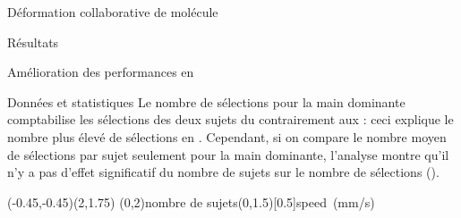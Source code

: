\documentclass[myfrancais,ngerman,english,frenchb]{mythesis}
\begin{document}
\begin{mychapter}{Déformation collaborative de molécule}
\begin{mysection}{Résultats}
\begin{mysubsection}{Amélioration des performances en }
\begin{mysubsubsection}{Données et statistiques}
					Le nombre de sélections pour la main dominante comptabilise les sélections des deux sujets du  contrairement aux  : ceci explique le nombre plus élevé de sélections en .
					Cependant, si on compare le nombre moyen de sélections par sujet seulement pour la main dominante, l'analyse montre qu'il n'y a pas d'effet significatif du nombre de sujets  sur le nombre de sélections  ().

					\begin{myfigure}
						\begin{myps}(-0.45,-0.45)(2,1.75)
							\myaxes(0,2){nombre de sujets}(0,1.5)[0.5]{speed~(mm/s)}
						\end{myps}
					\end{myfigure}


\end{mysubsubsection}
\end{mysubsection}
\end{mysection}
\end{mychapter}
\end{document}
